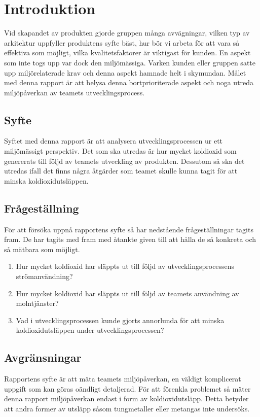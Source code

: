 \section{Introduktion}
\label{sec:joel_a-introduction}
Vid skapandet av produkten gjorde gruppen många avvägningar, vilken typ av arkitektur uppfyller produktens syfte bäst, hur bör vi arbeta för att vara så effektiva som möjligt, vilka kvalitetsfaktorer är viktigast för kunden. En aspekt som inte togs upp var dock den miljömässiga. Varken kunden eller gruppen satte upp miljörelaterade krav och denna aspekt hamnade helt i skymundan. Målet med denna rapport är att belysa denna bortprioriterade aspekt och noga utreda miljöpåverkan av teamets utvecklingsprocess.

\subsection{Syfte}
Syftet med denna rapport är att analysera utvecklingsprocessen ur ett miljömässigt perspektiv. Det som ska utredas är hur mycket koldioxid som genererats till följd av teamets utveckling av produkten. Dessutom så ska det utredas ifall det finns några åtgärder som teamet skulle kunna tagit för att minska koldioxidutsläppen.

\subsection{Frågeställning}
\label{subsec:joel_a-research-questions}
För att försöka uppnå rapportens syfte så har nedstående frågeställningar tagits fram. De har tagits med fram med åtankte given till att hålla de så konkreta och så mätbara som möjligt.

\begin{enumerate}
\item Hur mycket koldioxid har släppts ut till följd av utvecklingsprocessens strömanvändning?

\item Hur mycket koldioxid har släppts ut till följd av teamets användning av molntjänster?

\item Vad i utvecklingsprocessen kunde gjorts annorlunda för att minska koldioxidutsläppen under utvecklingsprocessen?

\end{enumerate}

\subsection{Avgränsningar}
\label{subsec:joel_a-delimitations}
Rapportens syfte är att mäta teamets miljöpåverkan, en väldigt komplicerat uppgift som kan göras oändligt detaljerad. För att förenkla problemet så mäter denna rapport miljöpåverkan endast i form av koldioxidutsläpp. Detta betyder att andra former av utsläpp såsom tungmetaller eller metangas inte undersöks.